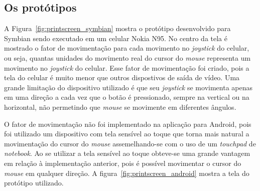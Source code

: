 \subsection{Os protótipos}

A Figura~\ref{fig:printscreen_symbian} mostra o protótipo desenvolvido para Symbian sendo executado em um celular Nokia N95. No centro da tela é mostrado o fator de movimentação para cada movimento no \emph{joystick} do celular, ou seja, quantas unidades do movimento real do cursor do \emph{mouse} representa um movimento no \emph{joystick} do celular. Esse fator de movimentação foi criado, pois a tela do celular é muito menor que outros dispostivos de saída de vídeo. Uma grande limitação do dispositivo utilizado é que seu \emph{joystick} se movimenta apenas em uma direção a cada vez que o botão é pressionado, sempre na vertical ou na horizontal, não permetindo que \emph{mouse} se movimente em diferentes ângulos.

O fator de movimentação não foi implementado na aplicação para Android, pois foi utilizado um dispositivo com tela sensível ao toque que torna mais natural a movimentação do cursor do \emph{mouse} assemelhando-se com o uso de um \emph{touchpad} de \emph{notebook}. Ao se utilizar a tela sensível ao toque obteve-se uma grande vantagem em relação à implementação anterior, pois é possível movimentar o cursor do \emph{mouse} em qualquer direção. A figura~\ref{fig:printscreen_android} mostra a tela do protótipo utilizado.

